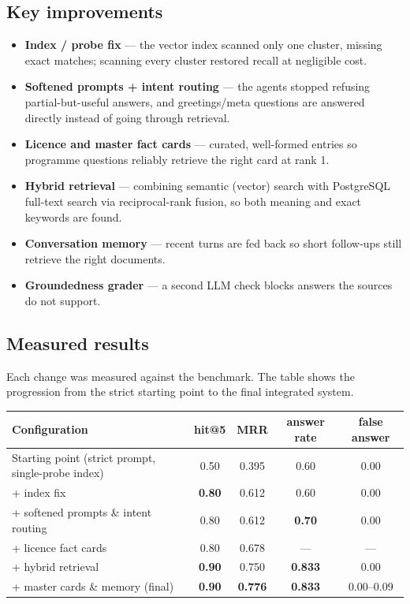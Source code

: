 \documentclass[11pt,a4paper]{article}
\begin{document}
\subsection{Key improvements}
\begin{itemize}
\item \textbf{Index / probe fix} --- the vector index scanned only one cluster, missing exact matches; scanning every cluster restored recall at negligible cost.
\item \textbf{Softened prompts + intent routing} --- the agents stopped refusing partial-but-useful answers, and greetings/meta questions are answered directly instead of going through retrieval.
\item \textbf{Licence and master fact cards} --- curated, well-formed entries so programme questions reliably retrieve the right card at rank 1.
\item \textbf{Hybrid retrieval} --- combining semantic (vector) search with PostgreSQL full-text search via reciprocal-rank fusion, so both meaning and exact keywords are found.
\item \textbf{Conversation memory} --- recent turns are fed back so short follow-ups still retrieve the right documents.
\item \textbf{Groundedness grader} --- a second LLM check blocks answers the sources do not support.
\end{itemize}

\subsection{Measured results}
Each change was measured against the benchmark. The table shows the progression from the strict starting point to the final integrated system.

\begin{center}
\begin{tabular}{@{}l cccc@{}}
\toprule
\textbf{Configuration} & \textbf{hit@5} & \textbf{MRR} & \textbf{answer rate} & \textbf{false answer}\\
\midrule
Starting point (strict prompt, single-probe index) & 0.50 & 0.395 & 0.60 & 0.00\\
+ index fix & \textbf{0.80} & 0.612 & 0.60 & 0.00\\
+ softened prompts \& intent routing & 0.80 & 0.612 & \textbf{0.70} & 0.00\\
+ licence fact cards & 0.80 & 0.678 & --- & ---\\
+ hybrid retrieval & \textbf{0.90} & 0.750 & \textbf{0.833} & 0.00\\
+ master cards \& memory (final) & \textbf{0.90} & \textbf{0.776} & \textbf{0.833} & 0.00--0.09\\
\bottomrule
\end{tabular}
\end{center}
\end{document}
